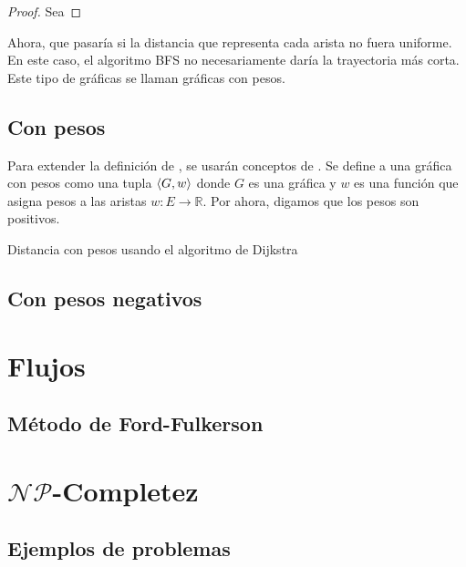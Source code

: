 \begin{proof}
  Sea
\end{proof}

Ahora, que pasaría si la distancia que representa cada arista no fuera uniforme.
En este caso, el algoritmo BFS no necesariamente daría la trayectoria más corta.
Este tipo de gráficas se llaman gráficas con pesos.

\subsection{Con pesos}

Para extender la definición de \cite{Diestel2017}, se usarán conceptos de
\cite{Bondy2008}. Se define a una gráfica con pesos como una tupla $\langle G, w \rangle$
donde $G$ es una gráfica y $w$ es una función que asigna pesos a las aristas
$w: E \to \mathbb{R}$. Por ahora, digamos que los pesos son positivos.

\begin{algorithm}
  \caption{Distancia con pesos usando el algoritmo de Dijkstra}
  \label{alg:dijkstra}
  \begin{algorithmic}[1]
  \end{algorithmic}
\end{algorithm}
\subsection{Con pesos negativos}

\section{Flujos}

\subsection{Método de Ford-Fulkerson}

\section{$\mathcal{NP}$-Completez}

\subsection{Ejemplos de problemas}

